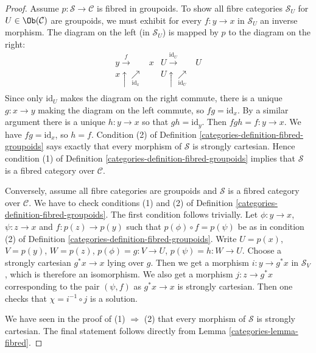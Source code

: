 \begin{proof}

Assume $p : \mathcal{S} \to \mathcal{C}$ is fibred in groupoids.
To show all fibre categories $\mathcal{S}_U$ for
$U \in \Ob(\mathcal{C})$
are groupoids, we must exhibit for every $f : y \to x$ in $\mathcal{S}_U$ an
inverse morphism. The diagram on the left (in $\mathcal{S}_U$) is mapped by
$p$ to the diagram on the right:
$$
\begin{array}{cccc}y \overset{f}{\longrightarrow} & x & U \overset{\text{id}_U}{\longrightarrow} & U \\ x \uparrow\underset{\text{id}_x}{\nearrow} &  & U \uparrow\underset{\text{id}_U}{\nearrow} &  \\  &  &  & \end{array}
$$
Since only $\text{id}_U$ makes the diagram on the right commute, there is a
unique $g : x \to y$ making the diagram on the left commute, so
$fg = \text{id}_x$. By a similar argument there is a unique $h : y \to x$ so
that $gh = \text{id}_y$. Then $fgh = f : y \to x$. We have $fg = \text{id}_x$,
so $h = f$. Condition (2) of Definition \ref{categories-definition-fibred-groupoids} says
exactly that every morphism of $\mathcal{S}$ is strongly cartesian. Hence
condition (1) of Definition \ref{categories-definition-fibred-groupoids} implies that
$\mathcal{S}$ is a fibred category over $\mathcal{C}$.

\medskip\noindent
Conversely, assume all fibre categories are groupoids and
$\mathcal{S}$ is a fibred category over $\mathcal{C}$.
We have to check conditions (1) and (2) of
Definition \ref{categories-definition-fibred-groupoids}.
The first condition follows trivially. Let $\phi : y \to x$,
$\psi : z \to x$ and $f : p(z) \to p(y)$ such that
$p(\phi) \circ f = p(\psi)$ be as in condition (2) of
Definition \ref{categories-definition-fibred-groupoids}.
Write $U = p(x)$, $V = p(y)$, $W = p(z)$, $p(\phi) = g : V \to U$,
$p(\psi) = h : W \to U$. Choose a strongly cartesian $g^*x \to x$
lying over $g$. Then we get a morphism $i : y \to g^*x$ in
$\mathcal{S}_V$, which is therefore an isomorphism. We
also get a morphism $j : z \to g^*x$ corresponding to
the pair $(\psi, f)$ as $g^*x \to x$ is strongly cartesian.
Then one checks that $\chi = i^{-1} \circ j$ is a solution.

\medskip\noindent
We have seen in the proof of (1) $\Rightarrow$ (2) that
every morphism of $\mathcal{S}$ is strongly cartesian.
The final statement follows directly from Lemma \ref{categories-lemma-fibred}.
\end{proof}

